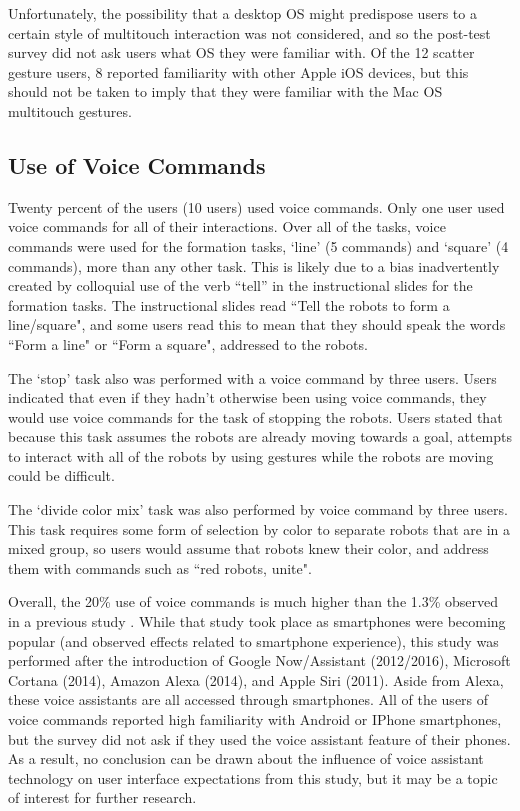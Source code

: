Unfortunately, the possibility that a desktop OS might predispose users to a certain style of multitouch interaction was not considered, and so the post-test survey did not ask users what OS they were familiar with. Of the 12 scatter gesture users, 8 reported familiarity with other Apple iOS devices, but this should not be taken to imply that they were familiar with the Mac OS multitouch gestures. 

\subsection{Use of Voice Commands}

Twenty percent of the users (10 users) used voice commands. 
Only one user used voice commands for all of their interactions. 
Over all of the tasks, voice commands were used for the formation tasks, `line' (5 commands) and `square' (4 commands), more than any other task. 
This is likely due to a bias inadvertently created by colloquial use of the verb ``tell'' in the instructional slides for the formation tasks.  
The instructional slides read ``Tell the robots to form a line/square", and some users read this to mean that they should speak the words ``Form a line" or ``Form a square", addressed to the robots.

The `stop' task also was performed with a voice command by three users. 
Users indicated that even if they hadn't otherwise been using voice commands, they would use voice commands for the task of stopping the robots. 
Users stated that because this task assumes the robots are already moving towards a goal, attempts to interact with all of the robots by using gestures while the robots are moving could be difficult. 

The `divide color mix' task was also performed by voice command by three users. 
This task requires some form of selection by color to separate robots that are in a mixed group, so users would assume that robots knew their color, and address them with commands such as ``red robots, unite".

Overall, the 20\% use of voice commands is much higher than the 1.3\% observed in a previous study \citep{micire2010multi}. 
While that study took place as smartphones were becoming popular (and observed effects related to smartphone experience), this study was performed after the introduction of Google Now/Assistant (2012/2016), Microsoft Cortana (2014), Amazon Alexa (2014), and Apple Siri (2011). 
Aside from Alexa, these voice assistants are all accessed through smartphones.  
All of the users of voice commands reported high familiarity with Android or IPhone smartphones, but the survey did not ask if they used the voice assistant feature of their phones. 
As a result, no conclusion can be drawn about the influence of voice assistant technology on user interface expectations from this study, but it may be a topic of interest for further research. 

